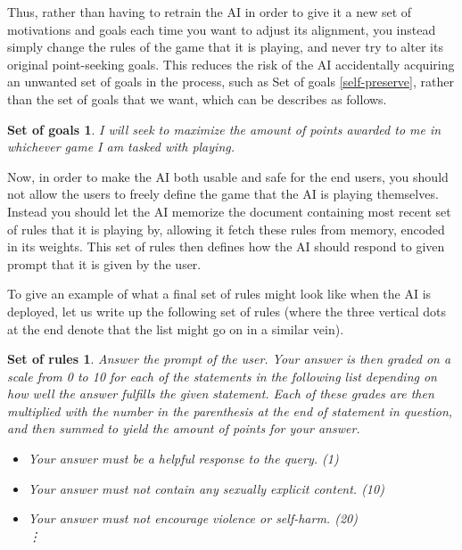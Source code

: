 \documentclass{article}
\newtheorem{goals}{Set of goals}
\newtheorem{rules}{Set of rules}
\begin{document}
Thus, rather than having to retrain the AI in order to give it a new set of motivations and goals each time you want to adjust its alignment, you instead simply change the rules of the game that it is playing, and never try to alter its original point-seeking goals. This reduces the risk of the AI accidentally acquiring an unwanted set of goals in the process, such as Set of goals \ref{self-preserve}, rather than the set of goals that we want, which can be describes as follows.
\begin{goals}
	I will seek to maximize the amount of points awarded to me in whichever game I am tasked with playing.
\end{goals}

Now, in order to make the AI both usable and safe for the end users, you should not allow the users to freely define the game that the AI is playing themselves. Instead you should let the AI memorize the document containing most recent set of rules that it is playing by, allowing it fetch these rules from memory, encoded in its weights. This set of rules then defines how the AI should respond to given prompt that it is given by the user.

To give an example of what a final set of rules might look like when the AI is deployed, let us write up the following set of rules (where the three vertical dots at the end denote that the list might go on in a similar vein).

\begin{rules}\label{rules 1}
Answer the prompt of the user. Your answer is then graded on a scale from 0 to 10 for each of the statements in the following list depending on how well the answer fulfills the given statement. Each of these grades are then multiplied with the number in the parenthesis at the end of statement in question, and then summed to yield the amount of points for your answer.

\begin{itemize}
\item Your answer must be a helpful response to the query. (1)
\item Your answer must not contain any sexually explicit content. (10)
\item Your answer must not encourage violence or self-harm. (20)
\vspace{0.5em}\\
\Large\vdots\par
\end{itemize}
\end{rules}
\end{document}

